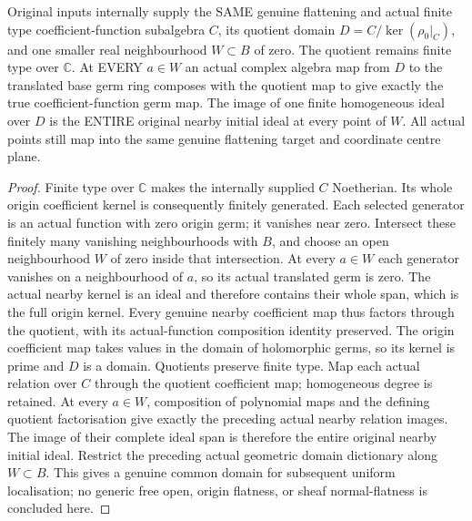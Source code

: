 \begin{theorem}
\label{hir:real-domain-original-common-domain-coefficient-initial-family}
\leanok
Original inputs internally supply the SAME genuine flattening and actual
finite type coefficient-function subalgebra $C$, its quotient domain
$D=C/\ker(\rho_0|_C)$, and one smaller real neighbourhood $W\subset B$ of zero.
The quotient remains finite type over $\mathbb C$. At EVERY $a\in W$ an actual
complex algebra map from $D$ to the translated base germ ring composes with
the quotient map to give exactly the true coefficient-function germ map.
The image of one finite homogeneous ideal over $D$ is the ENTIRE original
nearby initial ideal at every point of $W$. All actual points still map into
the same genuine flattening target and coordinate centre plane.
\end{theorem}
\begin{proof}
Finite type over $\mathbb C$ makes the internally supplied $C$ Noetherian.
Its whole origin coefficient kernel is consequently finitely generated.
Each selected generator is an actual function with zero origin germ; it
vanishes near zero. Intersect these finitely many vanishing neighbourhoods
with $B$, and choose an open neighbourhood $W$ of zero inside that
intersection. At every $a\in W$ each generator vanishes on a neighbourhood
of $a$, so its actual translated germ is zero. The actual nearby kernel is
an ideal and therefore contains their whole span, which is the full origin
kernel. Every genuine nearby coefficient map thus factors through the
quotient, with its actual-function composition identity preserved.
The origin coefficient map takes values in the domain of holomorphic germs,
so its kernel is prime and $D$ is a domain. Quotients preserve finite type.
Map each actual relation over $C$ through the quotient coefficient map;
homogeneous degree is retained. At every $a\in W$, composition of polynomial
maps and the defining quotient factorisation give exactly the preceding
actual nearby relation images. The image of their complete ideal span is
therefore the entire original nearby initial ideal. Restrict the preceding
actual geometric domain dictionary along $W\subset B$. This gives a genuine
common domain for subsequent uniform localisation; no generic free open,
origin flatness, or sheaf normal-flatness is concluded here.
\end{proof}
